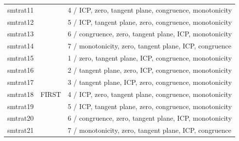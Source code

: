 \begin{table}[]
\begin{tabular}{|c|c|c|}
    \multicolumn{1}{|l|}{smtrat11} & \multicolumn{1}{l|}{}                        & \multicolumn{1}{l|}{4 / ICP, zero, tangent plane, congruence, monotonicity} \\ \cline{1-1} \cline{3-3} 
    \multicolumn{1}{|l|}{smtrat12} & \multicolumn{1}{l|}{}                        & \multicolumn{1}{l|}{5 / ICP, tangent plane, zero, congruence, monotonicity} \\ \cline{1-1} \cline{3-3} 
    \multicolumn{1}{|l|}{smtrat13} & \multicolumn{1}{l|}{}                        & \multicolumn{1}{l|}{6 / congruence, zero, tangent plane, ICP, monotonicity} \\ \cline{1-1} \cline{3-3} 
    \multicolumn{1}{|l|}{smtrat14} & \multicolumn{1}{l|}{}                        & \multicolumn{1}{l|}{7 / monotonicity, zero, tangent plane, ICP, congruence} \\ \hline
    smtrat15                       & \multirow{7}{*}{FIRST}                       & 1 / zero, tangent plane, ICP, congruence, monotonicity                      \\ \cline{1-1} \cline{3-3} 
    \multicolumn{1}{|l|}{smtrat16} &                                              & \multicolumn{1}{l|}{ 2 / tangent plane, zero, ICP, congruence, monotonicity} \\ \cline{1-1} \cline{3-3} 
    smtrat17                       &                                              & 3 / tangent plane, ICP, zero, congruence, monotonicity                      \\ \cline{1-1} \cline{3-3} 
    smtrat18                       &                                              & 4 / ICP, zero, tangent plane, congruence, monotonicity                      \\ \cline{1-1} \cline{3-3} 
    smtrat19                       &                                              & 5 / ICP, tangent plane, zero, congruence, monotonicity                      \\ \cline{1-1} \cline{3-3} 
    smtrat20                       &                                              & 6 / congruence, zero, tangent plane, ICP, monotonicity                      \\ \cline{1-1} \cline{3-3} 
    \multicolumn{1}{|l|}{smtrat21} &                                              & \multicolumn{1}{l|}{7 / monotonicity, zero, tangent plane, ICP, congruence} \\ \hline
    \end{tabular}
    \label{table:ourSolvers_heuristics_sequences}
\end{table}

